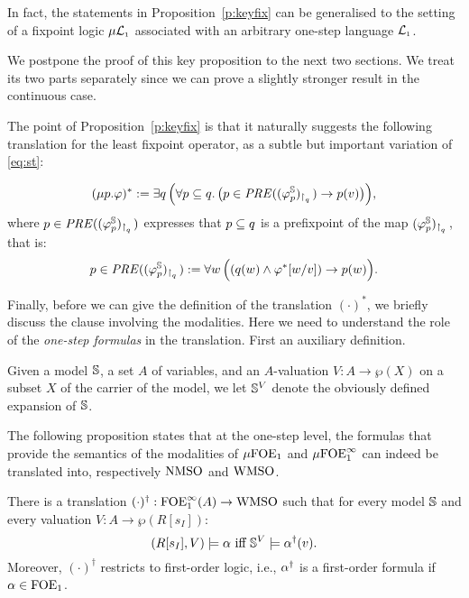 \begin{remark}
In fact, the statements in Proposition~\ref{p:keyfix} can be generalised to the
setting of a fixpoint logic $\mu\mathcal{L}_{\scriptscriptstyle 1}$ associated with an arbitrary one-step 
language $\mathcal{L}_{\scriptscriptstyle 1}$.
\end{remark}

We postpone the proof of this key proposition to the next two sections.
We treat its two parts separately since we can prove a slightly stronger result
in the continuous case.

\newcommand{\PRE}{\mathit{PRE}}
The point of Proposition~\ref{p:keyfix} is that it naturally suggests the
following translation for the least fixpoint operator, as a subtle but important 
variation of \eqref{eq:st}:

\begin{equation}
\label{eq:trlmu}
(\mu p. \varphi)^{*} \df 
   \exists q\,\Big(\forall  p \subseteq q.\,
      \big(p \in \PRE((\varphi^{\model}_{p})_{\rst{q}}) \to p(v)\big)\Big),
\end{equation}
where $p \in \PRE((\varphi^{\model}_{p})_{\rst{q}})$ expresses that $p \subseteq q$ 
is a prefixpoint of the map $(\varphi^{\mathbb{S}}_{p})_{{\upharpoonright}_{q}\,}$, that is:
\[
p  \in \PRE((\varphi^{\model}_{p})_{\rst{q}}) \df
\forall w\, \Big(
( q(w) \land \varphi^{*}[w/v]) \to p(w)
\Big).
\]

Finally, before we can give the definition of the translation $(\cdot)^{*}$, we
briefly discuss the clause involving the modalities.
Here we need to understand the role of the \emph{one-step formulas} in the 
translation.
First an auxiliary definition.

\begin{definition}
Given a model $\mathbb{S}$, a set $A$ of variables, and an $A$-valuation $V: A \to
\wp(X)$ on a subset $X$ of the carrier of the model, we let $\mathbb{S}^{V}$ denote
the obviously defined expansion of $\mathbb{S}$.
\end{definition}

The following proposition states that at the one-step level, the formulas that 
provide the semantics of the modalities of $\mu\mathrm{FOE}_1$ and $\mu\mathrm{FOE}^{\infty}_1$ can indeed 
be translated into, respectively $\mathrm{NMSO}$ and $\mathrm{WMSO}$.

\begin{proposition}
\label{p:1trl}
There is a translation $(\cdot)^{\dag}: \mathrm{FOE}^{\infty}_1(A) \to \mathrm{WMSO}$ such that for every 
model $\mathbb{S}$ and every valuation $V: A \to \wp(R[s_{I}])$:
\[
(R[s_{I}],V) \models \al \text{ iff } \model^{V} \models \al^{\dag}(v).
\]
Moreover, $(\cdot)^{\dag}$ restricts to first-order logic, i.e., $\alpha^{\dag}$ is
a first-order formula if $\alpha \in \mathrm{FOE}_1$.
\end{proposition}


